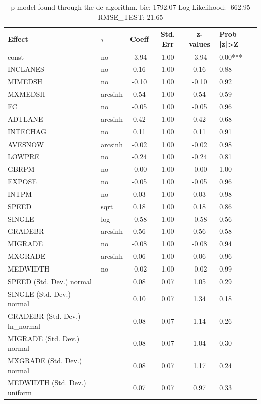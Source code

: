 \begin{table}
	\caption{p model found through the de algorithm. bic: 1792.07 Log-Likelihood: -662.95 RMSE_TEST: 21.65}
	\begin{center}
		\begin{tabular}{|l|l|c|c|c|l|}
			\hline
			Effect & $\tau$ & Coeff & Std. Err & z-values & Prob |z|>Z \\
			\hline
			const & no & -3.94 & 1.00 & -3.94 & 0.00*** \\
			\hline
			INCLANES & no & 0.16 & 1.00 & 0.16 & 0.88 \\
			\hline
			MIMEDSH & no & -0.10 & 1.00 & -0.10 & 0.92 \\
			\hline
			MXMEDSH & arcsinh & 0.54 & 1.00 & 0.54 & 0.59 \\
			\hline
			FC & no & -0.05 & 1.00 & -0.05 & 0.96 \\
			\hline
			ADTLANE & arcsinh & 0.42 & 1.00 & 0.42 & 0.68 \\
			\hline
			INTECHAG & no & 0.11 & 1.00 & 0.11 & 0.91 \\
			\hline
			AVESNOW & arcsinh & -0.02 & 1.00 & -0.02 & 0.98 \\
			\hline
			LOWPRE & no & -0.24 & 1.00 & -0.24 & 0.81 \\
			\hline
			GBRPM & no & -0.00 & 1.00 & -0.00 & 1.00 \\
			\hline
			EXPOSE & no & -0.05 & 1.00 & -0.05 & 0.96 \\
			\hline
			INTPM & no & 0.03 & 1.00 & 0.03 & 0.98 \\
			\hline
			SPEED & sqrt & 0.18 & 1.00 & 0.18 & 0.86 \\
			\hline
			SINGLE & log & -0.58 & 1.00 & -0.58 & 0.56 \\
			\hline
			GRADEBR & arcsinh & 0.56 & 1.00 & 0.56 & 0.58 \\
			\hline
			MIGRADE & no & -0.08 & 1.00 & -0.08 & 0.94 \\
			\hline
			MXGRADE & arcsinh & 0.06 & 1.00 & 0.06 & 0.96 \\
			\hline
			MEDWIDTH & no & -0.02 & 1.00 & -0.02 & 0.99 \\
			\hline
			SPEED (Std. Dev.) normal &  & 0.08 & 0.07 & 1.05 & 0.29 \\
			\hline
			SINGLE (Std. Dev.) normal &  & 0.10 & 0.07 & 1.34 & 0.18 \\
			\hline
			GRADEBR (Std. Dev.) ln_normal &  & 0.08 & 0.07 & 1.14 & 0.26 \\
			\hline
			MIGRADE (Std. Dev.) normal &  & 0.08 & 0.07 & 1.04 & 0.30 \\
			\hline
			MXGRADE (Std. Dev.) normal &  & 0.08 & 0.07 & 1.17 & 0.24 \\
			\hline
			MEDWIDTH (Std. Dev.) uniform &  & 0.07 & 0.07 & 0.97 & 0.33 \\
			\hline
		\end{tabular}
	\end{center}
\end{table}